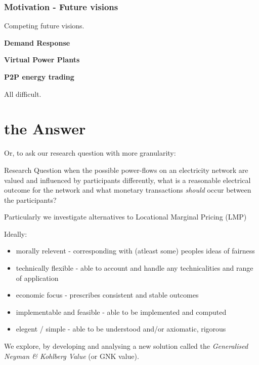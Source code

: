 \begin{frame}
\frametitle{Motivation - Future visions}
Competing future visions.

\textbf{Demand Response}

\textbf{Virtual Power Plants}

\textbf{P2P energy trading}

All difficult.
\end{frame}

\section{the Answer}

\begin{frame}
Or, to ask our research question with more granularity:
\begin{block}{Research Question}
when the possible power-flows on an electricity network are valued and influenced by participants differently, 
what is a reasonable electrical outcome for the network and what monetary transactions \textit{should} occur between the participants?
\end{block}
Particularly we investigate alternatives to Locational Marginal Pricing (LMP)
\end{frame}


\begin{frame}
Ideally:
\begin{itemize}
\item	morally relevent - corresponding with (atleast some) peoples ideas of fairness
\item	technically flexible - able to account and handle any technicalities and range of application
\item	economic focus - prescribes consistent and stable outcomes
\item	implementable and feasible - able to be implemented and computed
\item	elegent / simple - able to be understood and/or axiomatic, rigorous
\end{itemize}
We explore, by developing and analysing a new solution called the \textit{Generalised Neyman \& Kohlberg Value} (or GNK value).
\end{frame}


